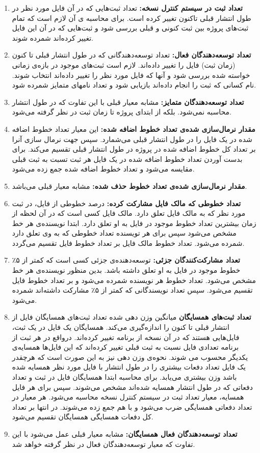 \begin{enumerate}
\item
\textbf{تعداد ثبت در سیستم کنترل نسخه:}
 تعداد ثبت‌هایی که در آن فایل مورد نظر در طول انتشار قبلی تاکنون تغییر کرده است. برای محاسبه ی آن لازم است که تمام ثبت‌های پروژه بین ثبت کنونی و  قبلی بررسی شود و ثبت‌هایی که در آن این فایل تغییر کرده‌اند شمرده شوند.
 \item
\textbf{تعداد توسعه‌دهندگان 
	فعال:}
 تعداد توسعه‌دهندگانی که در طول انتشار قبلی تا کنون (زمان ثبت) فایل را تغییر داده‌اند. لازم است ثبت‌های موجود در باز‌ه‌ی زمانی خواسته شده بررسی شود و آنها که فایل مورد نظر را تغییر داده‌اند انتخاب شوند. نام کسانی که ثبت را انجام داده‌اند بازیابی شود و تعداد نامهای متمایز شمرده شود. 
 \item
 \textbf{تعداد توسعه‌دهندگان	متمایز:}
 مشابه معیار قبلی با این تفاوت که در طول انتشار محاسبه نمی‌شود. بلکه از ابتدای پروژه تا زمان ثبت در نظر گرفته می‌شود. 
\item
\textbf{مقدار نرمال‌سازی شده‌ی تعداد خطوط اضافه شده:}
این معیار تعداد خطوط اضافه شده در یک فایل را در طول انتشار قبلی می‌شمارد. سپس جهت نرمال سازی آنرا بر تعداد کل خطوط اضافه شده در پروژه در طول انتشار قبلی تقسیم می‌کند. برای بدست آوردن تعداد خطوط اضافه شده در یک فایل هر ثبت تسبت به ثبت قبلی مقایسه می‌شود و تعداد خطوط اضافه شده جمع زده می‌شود.
\item
\textbf{مقدار نرمال‌سازی شده‌ی تعداد خطوط حذف شده:}
مشابه معیار قبلی می‌باشد. 
\item
\textbf{تعداد خطوطی که مالک فایل مشارکت کرده:}
 درصد خطوطی  از فایل، در  ثبت مورد نظر  که به مالک فایل تعلق دارد. مالک فایل کسی است که در آن لحظه از زمان بیشترین تعداد خطوط موجود در فایل به او تعلق دارد. ابتدا نویسنده‌ی هر خط مشخص می‌شود سپس برای هر تویسنده تعداد خطوطی که به وی تعلق دارد شمرده می‌شود. تعداد خطوط مالک فایل بر تعداد خطوط فایل تقسیم می‌گردد.
\item
\textbf{تعداد مشارکت‌کنندگان جزئی:}
توسعه‌دهنده‌ی جزئی کسی است که کمتر از ۵٪ خطوط موجود در فایل به او تعلق داشته باشد. بدین منظور نویسنده‌ی هر خط مشخص می‌شود. تعداد خطوط هر نویسنده شمرده می‌شود و بر تعداد خطوط فایل تقسیم می‌شود. سپس تعداد نویسندگانی که کمتر از ۵٪ مشارکت داشته‌اند شمرده می‌شود. 
\item
\textbf{تعداد ثبت‌های همسایگان}
 میانگین وزن دهی شده تعداد ثبت‌های همسایگان فایل از انتشار قبلی تا کنون را اندازه‌گیری می‌کند. همسایگان یک فایل در یک ثبت، فایل‌هایی هستند که در آن نسخه از برنامه تغییر کرده‌اند. در‌واقع در هر ثبت از برنامه تعدادی فایل نسبت به ثبت قبلی تغییر کرده‌اند که این فایل‌ها همسایه‌ی یکدیگر محسوب می شوند. نحوه‌ی وزن دهی نیز به این صورت است که هرچقدر یک فایل تعداد دفعات بیشتری را در طول انتشار با فایل مورد نظر همسایه شده باشد وزن بیشتری می‌یابد. برای محاسبه ابتدا همسایگان فایل در ثبت  و تعداد دفعاتی که  در طول انتشار همسایه شده‌اند مشخص می‌شوند. سپس برای هر فایل همسایه، معیار تعداد ثبت در سیستم کنترل نسخه محاسبه می‌شود. هر معیار در تعداد دفعاتی همسایگی ضرب می‌شود و با هم جمع زده می‌شوند. در انتها بر تعداد کل دفعات همسایگی همسایگان تقسیم می‌شود. 
\item
\textbf{تعداد توسعه‌دهندگان فعال همسایگان:}
مشابه معیار قبلی عمل می‌شود با این تفاوت که معیار توسعه‌دهندگان فعال در نظر گرفته خواهد شد.


\end{enumerate}
